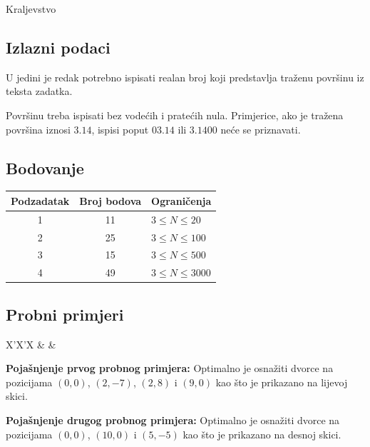 \begin{statement}[
  problempoints=100,
  timelimit=1 sekunda,
  memorylimit=512 MiB,
]{Kraljevstvo}
\subsection*{Izlazni podaci}
U jedini je redak potrebno ispisati realan broj koji predstavlja traženu
površinu iz teksta zadatka.

Površinu treba ispisati bez vodećih i pratećih nula. Primjerice, ako je
tražena površina iznosi $3.14$, ispisi poput $03.14$ ili $3.1400$ neće
se priznavati.

\subsection*{Bodovanje}
{\renewcommand{\arraystretch}{1.4}
  \setlength{\tabcolsep}{6pt}
  \begin{tabular}{ccl}
 Podzadatak & Broj bodova & Ograničenja \\ \midrule
  1 & 11 & $3 \le N \le 20$ \\
  2 & 25 & $3 \le N \le 100$ \\
  3 & 15 & $3 \le N \le 500$ \\
  4 & 49 & $3 \le N \le 3000$ \\
\end{tabular}}

\subsection*{Probni primjeri}
\begin{tabularx}{\textwidth}{X'X'X}
 &
 &
\end{tabularx}

\textbf{Pojašnjenje prvog probnog primjera:}
Optimalno je osnažiti dvorce na pozicijama $(0,0)$, $(2, -7)$, $(2, 8)$ i $(9, 0)$
kao što je prikazano na lijevoj skici.

\textbf{Pojašnjenje drugog probnog primjera:}
Optimalno je osnažiti dvorce na pozicijama $(0,0)$, $(10, 0)$ i $(5, -5)$
kao što je prikazano na desnoj skici.


\end{statement}

